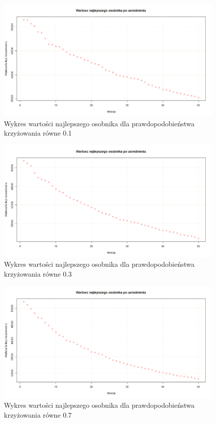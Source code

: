 \documentclass{article}
\begin{document}
\begin{figure}[H]
\centering

\includegraphics[scale=0.3]{IO_obrazy/US50_krz_01}
\caption{Wykres wartości najlepszego osobnika dla prawdopodobieństwa krzyżowania równe 0.1}
\end{figure}

\begin{figure}[H]
\centering

\includegraphics[scale=0.3]{IO_obrazy/US50_krz_03}
\caption{Wykres wartości najlepszego osobnika dla prawdopodobieństwa krzyżowania równe 0.3}
\end{figure}

\begin{figure}[H]
\centering

\includegraphics[scale=0.3]{IO_obrazy/US50_krz_07}
\caption{Wykres wartości najlepszego osobnika dla prawdopodobieństwa krzyżowania równe 0.7}
\end{figure}
\end{document}
